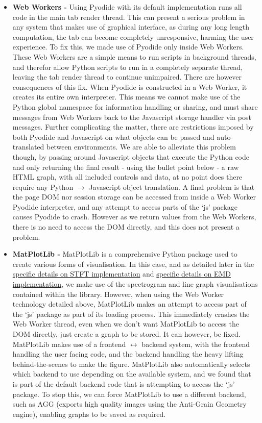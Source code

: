 \begin{itemize}
    \item {\bf Web Workers - } Using Pyodide with its default implementation runs all code in the main tab render thread. This can present a serious
    problem in any system that makes use of graphical interface, as during any long length computation, the tab can become completely unresponsive, harming the user experience.
    To fix this, we made use of Pyodide only inside Web Workers. These Web Workers are a simple means to run scripts in background threads, and therefor allow Python scripts to run
    in a completely separate thread, leaving the tab render thread to continue unimpaired. 
    There are however consequences of this fix. When Pyodide is constructed in a Web Worker, it creates its entire own interpreter. This means we cannot
    make use of the Python global namespace for information handling or sharing, and must share messages from Web Workers back to the Javascript storage handler via post messages.
    Further complicating the matter, there are restrictions imposed by both Pyodide and Javascript on what objects can be passed and auto-translated between environments.
    We are able to alleviate this problem though, by passing around Javascript objects that execute the Python code and only returning the final result - using the bullet point below - 
    a raw HTML graph, with all included controls and data, at no point does there require any Python $ \to $ Javascript object translation.
    A final problem is that the page DOM nor session storage can be accessed from inside a Web Worker Pyodide interpreter, and any attempt to access parts of the `js' package causes Pyodide to crash.
    However as we return values from the Web Workers, there is no need to access the DOM directly, and this does not present a problem.

    \item {\bf MatPlotLib - } MatPlotLib is a comprehensive Python package used to create various forms of visualisation. In this case, and as detailed later in the 
    \hyperref[stftsection]{specific details on STFT implementation} and \hyperref[emdsection]{specific details on EMD implementation}, we make use of the spectrogram
    and line graph visualisations contained within the library. However, when using the Web Worker technology detailed above, MatPlotLib makes an attempt to access part of the `js' package
    as part of its loading process. This immediately crashes the Web Worker thread, even when we don't want MatPlotLib to access the DOM directly, just create a graph to be stored.
    It can however, be fixed. MatPlotLib makes use of a frontend $ \leftrightarrow $ backend system,  with the frontend handling
    the user facing code, and the backend handling the heavy lifting behind-the-scenes to make the figure. MatPlotLib also automatically selects which backend to use depending on the available
    system, and we found that is part of the default backend code that is attempting to access the `js' package. 
    To stop this, we can force MatPlotLib to use a different backend, such as AGG (exports high quality images using the Anti-Grain Geometry engine), enabling graphs to be saved as required.


\end{itemize}
